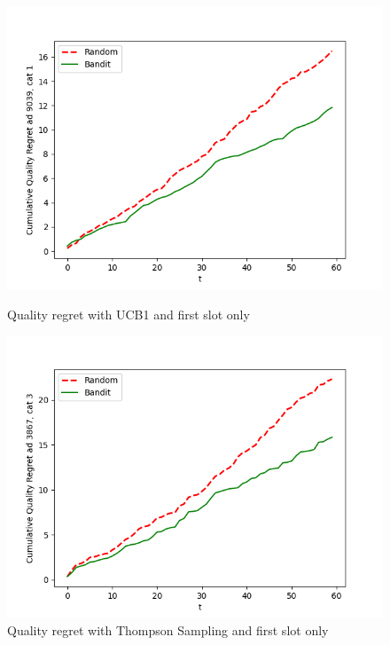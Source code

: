 \documentclass{article}
\begin{document}
\begin{figure}[H]

\begin{minipage}{0.48\textwidth}
\centering
\includegraphics[width=1\linewidth]{images/first only ucb1.png}
\caption{Quality regret with UCB1 and first slot only}
\label{fig:first_only_ucb1}
\end{minipage}
\hfill
\begin{minipage}{0.48\textwidth}
\centering
\includegraphics[width=1\linewidth]{images/First only ts.png}
\caption{Quality regret with Thompson Sampling and first slot only}
\label{fig:first_only_ts}
\end{minipage}

\end{figure}
\end{document}
